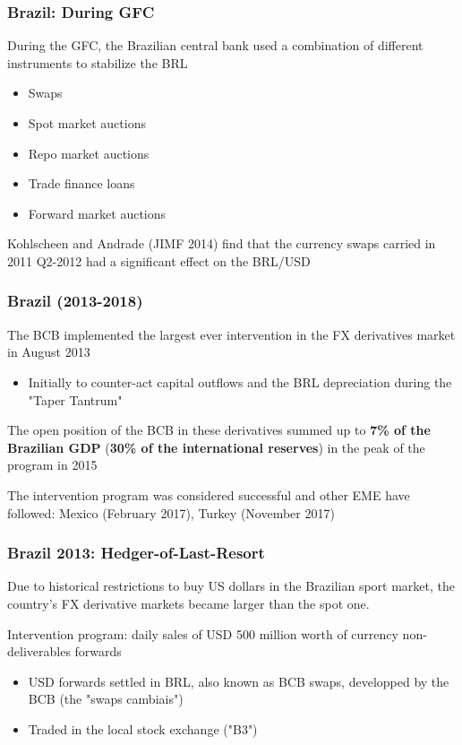 \documentclass{beamer}
\newenvironment{wideitemize}{\itemize\addtolength{\itemsep}{10pt}}{\enditemize}
\begin{document}
\begin{frame}
  \frametitle{Brazil: During GFC}
  \begin{wideitemize}
  \item During the GFC, the Brazilian central bank used a combination of different instruments to stabilize the BRL
    \begin{itemize}
    \item Swaps
    \item Spot market auctions
    \item Repo market auctions
    \item Trade finance loans
    \item Forward market auctions
    \end{itemize}
  \item Kohlscheen and Andrade (JIMF 2014) find that the currency swaps carried in 2011 Q2-2012 had a significant effect on the BRL/USD
  \end{wideitemize}
\end{frame}

\begin{frame}
  \frametitle{Brazil (2013-2018)}
  \begin{wideitemize}
    \item The BCB implemented the largest ever intervention in the FX derivatives market in August 2013
      \begin{itemize}
      \item Initially to counter-act capital outflows and the BRL depreciation during the "Taper Tantrum"
      \end{itemize}
  \item The open position of the BCB in these derivatives summed up to \textbf{7\% of the Brazilian GDP} (\textbf{30\% of the international reserves}) in the peak of the program in 2015
  \item The intervention program was considered successful and other EME have followed: Mexico (February 2017), Turkey (November 2017)
  \end{wideitemize}
\end{frame}


\begin{frame}
  \frametitle{Brazil 2013: Hedger-of-Last-Resort}
  \begin{wideitemize}
  \item Due to historical restrictions to buy US dollars in the Brazilian sport market, the country's FX derivative markets became larger than the spot one. 
  \item Intervention program: daily sales of USD 500 million worth of currency non-deliverables forwards
    \begin{itemize}
    \item USD forwards settled in BRL, also known as BCB swaps, developped by the BCB (the "swaps cambiais")
    \item Traded in the local stock exchange ("B3")
    \end{itemize}
    
  \end{wideitemize}
\end{frame}
\end{document}
